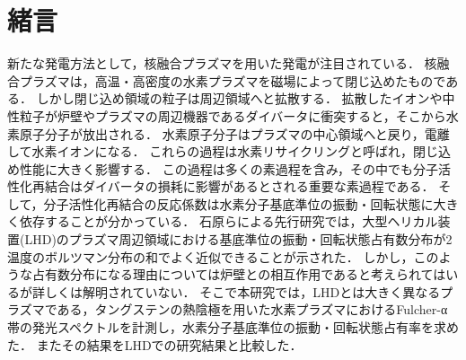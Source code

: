 \chapter{緒言}
\begin{comment}
新たな発電方法として，核融合発電が注目されている．
核融合発電とは重水素と三重水素の核融合反応によって生じるエネルギーを発電に利用する方法である．
核融合発電のメリットとして，海水から燃料を作り出せることや，二酸化炭素を排出しないこと，暴走のリスクが低く高レベルの核廃棄物を出さないことなどが挙げられる\cite{monbu-kagakusyou}．
しかし，実現までの技術的課題は多く，そのうちの一つにプラズマの閉じ込め性能の問題がある．
閉じ込め領域内の水素イオンは，中性粒子となってプラズマの周辺領域へと拡散してしまう．
\end{comment}
新たな発電方法として，核融合プラズマを用いた発電が注目されている．
核融合プラズマは，高温・高密度の水素プラズマを磁場によって閉じ込めたものである．
しかし閉じ込め領域の粒子は周辺領域へと拡散する．
拡散したイオンや中性粒子が炉壁やプラズマの周辺機器であるダイバータに衝突すると，そこから水素原子分子が放出される．
水素原子分子はプラズマの中心領域へと戻り，電離して水素イオンになる．
これらの過程は水素リサイクリングと呼ばれ，閉じ込め性能に大きく影響する\cite{hiramatsu}．
この過程は多くの素過程を含み，その中でも分子活性化再結合はダイバータの損耗に影響があるとされる重要な素過程である．
そして，分子活性化再結合の反応係数は水素分子基底準位の振動・回転状態に大きく依存することが分かっている．
石原らによる先行研究では，大型ヘリカル装置(LHD)のプラズマ周辺領域における基底準位の振動・回転状態占有数分布が2温度のボルツマン分布の和でよく近似できることが示された．
しかし，このような占有数分布になる理由については炉壁との相互作用であると考えられてはいるが詳しくは解明されていない．
そこで本研究では，LHDとは大きく異なるプラズマである，タングステンの熱陰極を用いた水素プラズマにおけるFulcher-α帯の発光スペクトルを計測し，水素分子基底準位の振動・回転状態占有率を求めた．
またその結果をLHDでの研究結果と比較した．

\begin{comment}
案2 2温度の理由
基底準位の振動・回転状態占有率は色々な反応に影響する．
例えば〇〇．他には〇〇．cite1.1807810.pdf
占有数は定回転量子数域では1温度，高回転量子数域まで含めると2温度のボルツマン分布で近似できることが報告されているcite
ところがその理由は壁表面との相互作用が原因とされているものの，詳しいことはわかっていないcite
さまざまな条件で計測することで
\end{comment}
